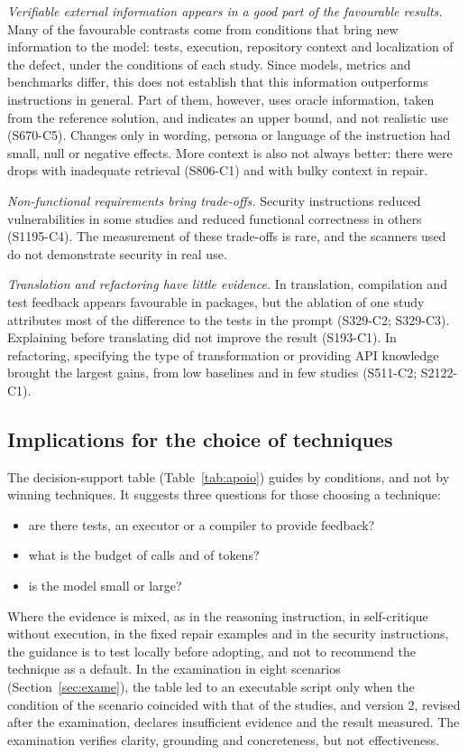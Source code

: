 \textit{Verifiable external information appears in a good part of the favourable results.} Many of the favourable
contrasts come from conditions that bring new information to the model: tests, execution, repository context and
localization of the defect, under the conditions of each study. Since models, metrics and benchmarks differ, this
does not establish that this information outperforms instructions in general. Part of them, however, uses oracle information, taken from the reference solution, and indicates an upper
bound, and not realistic use (S670-C5).
Changes only in wording, persona or language of the instruction had small, null or negative effects. More
context is also not always better: there were drops with inadequate retrieval (S806-C1) and with bulky context
in repair.

\textit{Non-functional requirements bring trade-offs.} Security instructions reduced vulnerabilities in some
studies and reduced functional correctness in others (S1195-C4). The measurement of these trade-offs is rare, and the
scanners used do not demonstrate security in real use.

\textit{Translation and refactoring have little evidence.} In translation, compilation and test feedback
appears favourable in packages, but the ablation of one study attributes most of the difference to the tests in the prompt
(S329-C2; S329-C3).
Explaining before translating did not improve the result (S193-C1).
In refactoring, specifying the type of transformation or providing API knowledge brought the largest gains, from low baselines and in few studies (S511-C2; S2122-C1).

\subsection{Implications for the choice of techniques}
The decision-support table (Table~\ref{tab:apoio}) guides by conditions, and not by winning techniques. It suggests three
questions for those choosing a technique:
\begin{itemize}
  \item are there tests, an executor or a compiler to provide feedback?
  \item what is the budget of calls and of tokens?
  \item is the model small or large?
\end{itemize}
Where the evidence is mixed, as in the reasoning instruction, in self-critique without execution, in the fixed
repair examples and in the security instructions, the guidance is to test locally before adopting, and not to recommend the technique
as a default. In the examination in eight scenarios (Section~\ref{sec:exame}), the table led
to an executable script only when the condition of the scenario coincided with that of the studies, and version 2,
revised after the examination, declares insufficient evidence and the result measured. The examination verifies clarity, grounding and concreteness,
but not effectiveness.


